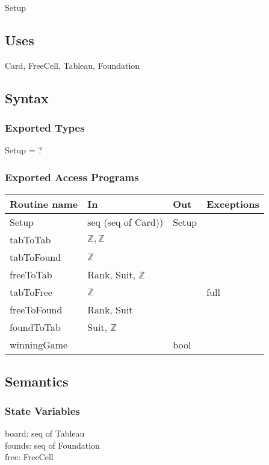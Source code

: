\documentclass[12pt]{article}
\begin{document}
Setup

\subsection* {Uses}

Card, FreeCell, Tableau, Foundation

\subsection* {Syntax}

\subsubsection* {Exported Types}

Setup = ?

\subsubsection* {Exported Access Programs}

\begin{tabular}{| l | l | l | l |}
\hline
\textbf{Routine name} & \textbf{In} & \textbf{Out} & \textbf{Exceptions}\\
\hline
Setup & seq (seq of Card)) & Setup & \\ 
\hline
tabToTab & $\mathbb{Z},\mathbb{Z}$  & ~ &\\ 
\hline
tabToFound & $\mathbb{Z}$  & ~ &\\ 
\hline
freeToTab & Rank, Suit, $\mathbb{Z}$  & ~ & ~ \\ 
\hline
tabToFree & $\mathbb{Z}$ & ~ & full \\
\hline
freeToFound & Rank, Suit & ~ & \\
\hline
foundToTab & Suit, $\mathbb{Z}$ & ~ & \\
\hline
winningGame & ~ & bool & \\
\hline
\end{tabular}

\subsection* {Semantics}

\subsubsection* {State Variables}

board: seq of Tableau\\
founds: seq of Foundation\\
free: FreeCell\\
\end{document}
